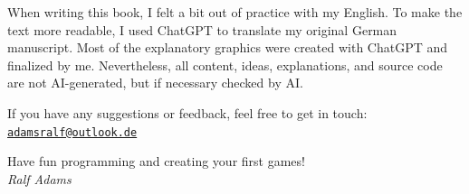 When writing this book, I felt a bit out of practice with my English. To make the text more readable, I used ChatGPT to translate my original German manuscript. Most of the explanatory graphics were created with ChatGPT and finalized by me. Nevertheless, all content, ideas, explanations, and source code are not AI-generated, but if necessary checked by AI. 

\vspace{1em}

If you have any suggestions or feedback, feel free to get in touch: \href{mailto:adamsralf@outlook.de}{\nolinkurl{adamsralf@outlook.de}}

\vspace{2em}

\noindent
Have fun programming and creating your first games!\\
\textit{Ralf Adams} 

